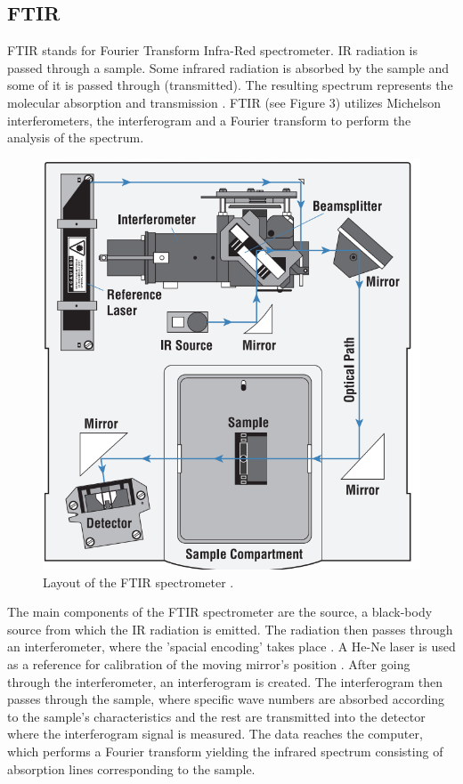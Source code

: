 \documentclass[reprint,amsmath,amssymb,aps, prl,superscriptaddress]{revtex4-2}
\begin{document}
\subsection{FTIR}
FTIR stands for Fourier Transform Infra-Red spectrometer.
IR radiation is passed through a sample.
Some
infrared radiation is absorbed by the sample and some of it is
passed through (transmitted). The resulting spectrum represents the molecular
absorption and transmission \cite{FTIRmanual}. FTIR (see Figure 3) utilizes Michelson interferometers, the interferogram and a Fourier transform to perform the analysis of the spectrum. 
\begin{figure}[H]
    \includegraphics[width=\linewidth]{Images/FTIR LAYOUT.png}
    \caption{Layout of the FTIR spectrometer \cite{FTIRmanual}.}
    \label{fig:FTIR}
    \centering
\end{figure}

The main components of the FTIR spectrometer are
the source, a black-body source from which the IR radiation is emitted. The radiation then passes through an interferometer, where the 'spacial encoding' takes place \cite{FTIRmanual}. A He-Ne laser is used as a reference for calibration of the moving mirror's position \cite{stuart}. After going through the interferometer, an interferogram is created. The interferogram then passes through the sample, where specific wave numbers are absorbed according to the sample's characteristics and the rest are transmitted into the detector where the interferogram signal is measured. The data reaches the computer, which performs a Fourier transform yielding the infrared spectrum consisting of absorption lines corresponding to the sample. 
\end{document}
